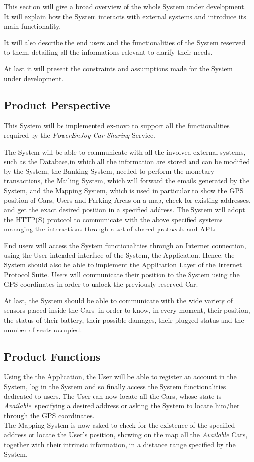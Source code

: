 This section will give a broad overview of the whole System under development. It will explain how the System interacts with external systems and introduce its main functionality.

It will also describe the end users and the functionalities of the System reserved to them, detailing all the informations relevant to clarify their needs.

At last it will present the constraints and assumptions made for the System under development.

\subsection{Product Perspective}

This System will be implemented ex-novo to support all the functionalities required by the \textit{PowerEnJoy Car-Sharing} Service.

The System will be able to communicate with all the involved external systems, such as the Database,in which all the information are stored and can be modified by the System, the Banking System, needed to perform the monetary transactions, the Mailing System, which will forward the emails generated by the System, and the Mapping System, which is used in particular to show the GPS position of Cars, Users and Parking Areas on a map, check for existing addresses, and get the exact desired position in a specified address. The System will adopt the HTTP(S) protocol to communicate with the above specified systems managing the interactions through a set of shared protocols and APIs.
\smallskip

End users will access the System functionalities through an Internet connection, using the User intended interface of the System, the Application. Hence, the System should also be able to implement the Application Layer of the Internet Protocol Suite.
Users will communicate their position to the System using the GPS coordinates in order to unlock the previously reserved Car.
\smallskip

At last, the System should be able to communicate with the wide variety of sensors placed inside the Cars, in order to know, in every moment, their position, the status of their battery, their possible damages, their plugged status and the number of seats occupied. 



\subsection{Product Functions}
Using the the Application, the User will be able to register an account in the System, log in the System and so finally access the System functionalities dedicated to users. The User can now locate all the Cars, whose state is \textit{Available}, specifying a desired address or asking the System to locate him/her through the GPS coordinates.\\
The Mapping System is now asked to check for the existence of the specified address or locate the User's position, showing on the map all the \textit{Available} Cars, together with their intrinsic information, in a distance range specified by the System. 
\smallskip

